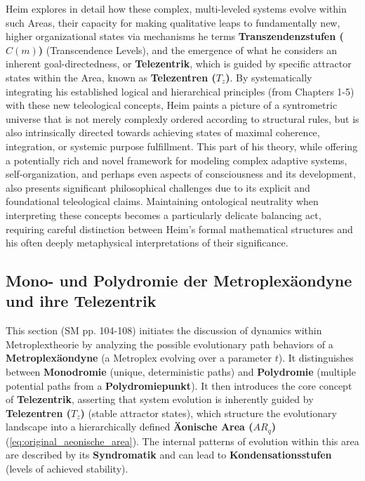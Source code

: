 \documentclass[12pt]{article}
\newcommand{\telezentrum}{T_z}
\newcommand{\aeonischearea}{AR_q}
\newcommand{\transzendenzstufe}[1]{C(#1)}
\begin{document}
Heim explores in detail how these complex, multi-leveled systems evolve within such Areas, their capacity for making qualitative leaps to fundamentally new, higher organizational states via mechanisms he terms \textbf{Transzendenzstufen (\(\transzendenzstufe{m}\))} (Transcendence Levels), and the emergence of what he considers an inherent goal-directedness, or \textbf{Telezentrik}, which is guided by specific attractor states within the Area, known as \textbf{Telezentren (\(\telezentrum\))}. By systematically integrating his established logical and hierarchical principles (from Chapters 1-5) with these new teleological concepts, Heim paints a picture of a syntrometric universe that is not merely complexly ordered according to structural rules, but is also intrinsically directed towards achieving states of maximal coherence, integration, or systemic purpose fulfillment. This part of his theory, while offering a potentially rich and novel framework for modeling complex adaptive systems, self-organization, and perhaps even aspects of consciousness and its development, also presents significant philosophical challenges due to its explicit and foundational teleological claims. Maintaining ontological neutrality when interpreting these concepts becomes a particularly delicate balancing act, requiring careful distinction between Heim's formal mathematical structures and his often deeply metaphysical interpretations of their significance.

\subsection{Mono- und Polydromie der Metroplexäondyne und ihre Telezentrik}
\label{sec:polydromie_telezentrik}

This section (SM pp. 104-108) initiates the discussion of dynamics within Metroplextheorie by analyzing the possible evolutionary path behaviors of a \textbf{Metroplexäondyne} (a Metroplex evolving over a parameter \(t\)). It distinguishes between \textbf{Monodromie} (unique, deterministic paths) and \textbf{Polydromie} (multiple potential paths from a \textbf{Polydromiepunkt}). It then introduces the core concept of \textbf{Telezentrik}, asserting that system evolution is inherently guided by \textbf{Telezentren (\(\telezentrum\))} (stable attractor states), which structure the evolutionary landscape into a hierarchically defined \textbf{\"{A}onische Area (\(\aeonischearea\))} (\eqref{eq:original_aeonische_area}). The internal patterns of evolution within this area are described by its \textbf{Syndromatik} and can lead to \textbf{Kondensationsstufen} (levels of achieved stability).
\end{document}
